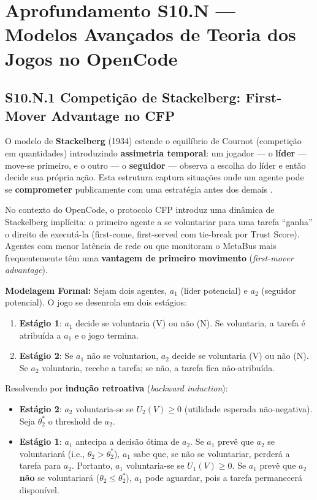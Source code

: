 
\section*{Aprofundamento S10.N --- Modelos Avançados de Teoria dos Jogos no OpenCode}

\subsection*{S10.N.1 Competição de Stackelberg: First-Mover Advantage no CFP}

O modelo de \textbf{Stackelberg} (1934) estende o equilíbrio de Cournot (competição em quantidades) introduzindo \textbf{assimetria temporal}: um jogador --- o \textbf{líder} --- move-se primeiro, e o outro --- o \textbf{seguidor} --- observa a escolha do líder e então decide sua própria ação. Esta estrutura captura situações onde um agente pode se \textbf{comprometer} publicamente com uma estratégia antes dos demais \cite{von1993market}.

No contexto do OpenCode, o protocolo CFP introduz uma dinâmica de Stackelberg implícita: o primeiro agente a se voluntariar para uma tarefa ``ganha'' o direito de executá-la (first-come, first-served com tie-break por Trust Score). Agentes com menor latência de rede ou que monitoram o MetaBus mais frequentemente têm uma \textbf{vantagem de primeiro movimento} (\textit{first-mover advantage}).

\textbf{Modelagem Formal:} Sejam dois agentes, $a_1$ (líder potencial) e $a_2$ (seguidor potencial). O jogo se desenrola em dois estágios:

\begin{enumerate}
    \item \textbf{Estágio 1}: $a_1$ decide se voluntaria (V) ou não (N). Se voluntaria, a tarefa é atribuída a $a_1$ e o jogo termina.
    \item \textbf{Estágio 2}: Se $a_1$ não se voluntariou, $a_2$ decide se voluntaria (V) ou não (N). Se $a_2$ voluntaria, recebe a tarefa; se não, a tarefa fica não-atribuída.
\end{enumerate}

Resolvendo por \textbf{indução retroativa} (\textit{backward induction}):

\begin{itemize}
    \item \textbf{Estágio 2}: $a_2$ voluntaria-se se $U_2(V) \geq 0$ (utilidade esperada não-negativa). Seja $\theta_2^*$ o threshold de $a_2$.
    \item \textbf{Estágio 1}: $a_1$ antecipa a decisão ótima de $a_2$. Se $a_1$ prevê que $a_2$ se voluntariará (i.e., $\theta_2 > \theta_2^*$), $a_1$ sabe que, se não se voluntariar, perderá a tarefa para $a_2$. Portanto, $a_1$ voluntaria-se se $U_1(V) \geq 0$. Se $a_1$ prevê que $a_2$ \textbf{não} se voluntariará ($\theta_2 \leq \theta_2^*$), $a_1$ pode aguardar, pois a tarefa permanecerá disponível.
\end{itemize}

